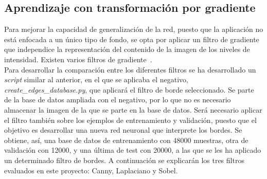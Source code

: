\subsection{Aprendizaje con transformación por gradiente}
\label{sec.bordes}
Para mejorar la capacidad de generalización de la red, puesto que la aplicación no está enfocada a un único tipo de fondo, se opta por aplicar un filtro de gradiente que independice la representación del contenido de la imagen de los niveles de intensidad. Existen varios filtros de gradiente~\cite{fundamentos}.\\

Para desarrollar la comparación entre los diferentes filtros se ha desarrollado un \textit{script} similar al anterior, en el que se aplicaba el negativo, \textit{create\_edges\_database.py}, que aplicará el filtro de borde seleccionado. Se parte de la base de datos ampliada con el negativo, por lo que no es necesario almacenar la imagen de la que se parte en la base de datos. Será necesario aplicar el filtro también sobre los ejemplos de entrenamiento y validación, puesto que el objetivo es desarrollar una nueva red neuronal que interprete los bordes. Se obtiene, así, una base de datos de entrenamiento con 48000 muestras, otra de validación con 12000, y una última de test con 20000, a las que se les ha aplicado un determinado filtro de bordes. A continuación se explicarán los tres filtros evaluados en este proyecto: Canny, Laplaciano y Sobel.
\vspace{10pt}
